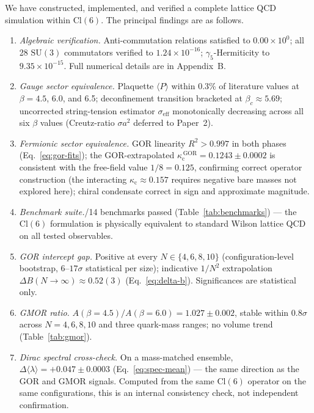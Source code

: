 \documentclass[12pt]{article}
\newcommand{\cl}{\mathrm{Cl}}          %
\newcommand{\su}{\mathrm{SU}}
\newcommand{\kc}{\kappa_{\mathrm{c}}}  %
\begin{document}
We have constructed, implemented, and verified a complete lattice QCD
simulation within $\cl(6)$.  The principal findings are as follows.

\begin{enumerate}

  \item \textit{Algebraic verification.}\enspace
        Anti-commutation relations satisfied to $0.00\times10^{0}$;
        all 28 $\su(3)$ commutators verified to $1.24\times10^{-16}$;
        $\gamma_5$-Hermiticity to $9.35\times10^{-15}$.
        Full numerical details are in Appendix~B.

  \item \textit{Gauge sector equivalence.}\enspace
        Plaquette $\langle P\rangle$ within 0.3\% of literature values
        at $\beta=4.5$, 6.0, and 6.5; deconfinement transition
        bracketed at $\beta_c\approx5.69$; uncorrected string-tension
        estimator $\sigma_{\text{eff}}$ monotonically decreasing across
        all six $\beta$ values (Creutz-ratio $\sigma a^2$ deferred to
        Paper~2).

  \item \textit{Fermionic sector equivalence.}\enspace
        GOR linearity $R^2>0.997$ in both phases
        (Eq.~\eqref{eq:gor-fits}); the GOR-extrapolated
        $\kc^{\,\text{GOR}}=0.1243\pm0.0002$ is consistent with
        the free-field value $1/8=0.125$, confirming correct
        operator construction (the interacting $\kc\approx0.157$
        requires negative bare masses not explored here); chiral
        condensate correct in sign and approximate magnitude.

  \item \textit{Benchmark suite.}/14 benchmarks passed (Table~\ref{tab:benchmarks}) ---
        the $\cl(6)$ formulation is physically equivalent to standard
        Wilson lattice QCD on all tested observables.

  \item \textit{GOR intercept gap.}\enspace
        Positive at every $N\in\{4,6,8,10\}$ (configuration-level
        bootstrap, $6$--$17\sigma$ statistical per size); indicative
        $1/N^2$ extrapolation $\Delta B(N\to\infty)\approx0.52(3)$
        (Eq.~\eqref{eq:delta-b}).  Significances are statistical only.

  \item \textit{GMOR ratio.}\enspace
        $A(\beta=4.5)/A(\beta=6.0) = 1.027\pm0.002$, stable within
        $0.8\sigma$ across $N=4,6,8,10$ and three quark-mass ranges;
        no volume trend (Table~\ref{tab:gmor}).

  \item \textit{Dirac spectral cross-check.}\enspace
        On a mass-matched ensemble, $\Delta\langle\lambda\rangle =
        +0.047\pm0.0003$ (Eq.~\eqref{eq:spec-mean}) --- the same
        direction as the GOR and GMOR signals.  Computed from the same
        $\cl(6)$ operator on the same configurations, this is an
        internal consistency check, not independent confirmation.

\end{enumerate}
\end{document}
